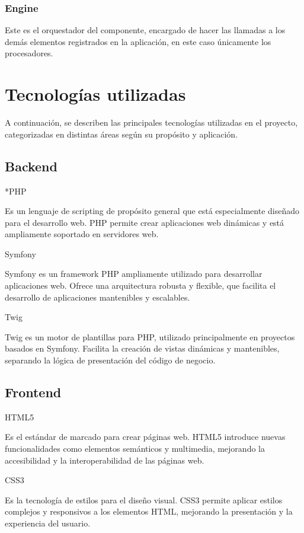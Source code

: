 \subsubsection*{Engine}
Este es el orquestador del componente, encargado de hacer las llamadas a los demás elementos registrados en la
aplicación, en este caso únicamente los procesadores.


\section{Tecnologías utilizadas}

A continuación, se describen las principales tecnologías utilizadas en el proyecto, categorizadas en distintas áreas
según su propósito y aplicación.

\subsection*{Backend}

*PHP

Es un lenguaje de scripting de propósito general que está especialmente diseñado para el desarrollo web.
PHP permite crear aplicaciones web dinámicas y está ampliamente soportado en servidores web.

Symfony

Symfony es un framework PHP ampliamente utilizado para desarrollar aplicaciones web.
Ofrece una arquitectura robusta y flexible, que facilita el desarrollo de aplicaciones mantenibles y escalables.

Twig

Twig es un motor de plantillas para PHP, utilizado principalmente en proyectos basados en
Symfony.
Facilita la creación de vistas dinámicas y mantenibles, separando la lógica de presentación del código de negocio.

\subsection*{Frontend}

HTML5

Es el estándar de marcado para crear páginas web.
HTML5 introduce nuevas funcionalidades como elementos semánticos y multimedia, mejorando la accesibilidad y la
interoperabilidad de las páginas web.

CSS3

Es la tecnología de estilos para el diseño visual.
CSS3 permite aplicar estilos complejos y responsivos a los elementos HTML, mejorando la presentación y la experiencia
del usuario.

